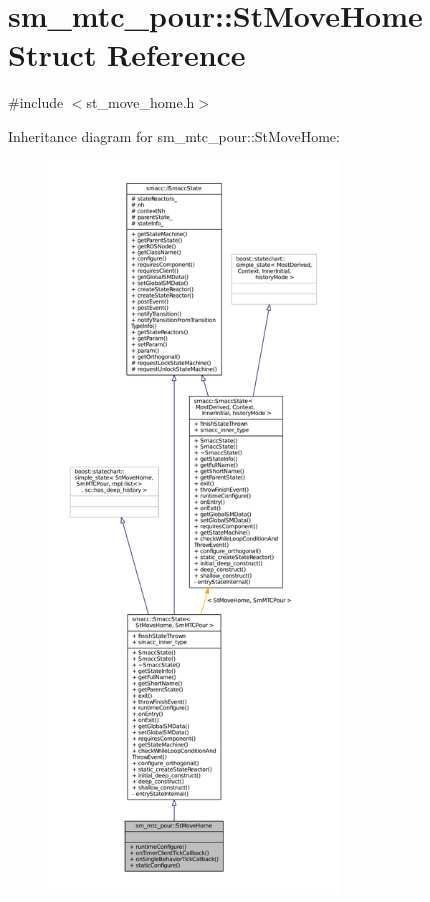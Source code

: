 \hypertarget{structsm__mtc__pour_1_1StMoveHome}{}\section{sm\+\_\+mtc\+\_\+pour\+:\+:St\+Move\+Home Struct Reference}
\label{structsm__mtc__pour_1_1StMoveHome}


{\ttfamily \#include $<$st\+\_\+move\+\_\+home.\+h$>$}



Inheritance diagram for sm\+\_\+mtc\+\_\+pour\+:\+:St\+Move\+Home\+:
\nopagebreak
\begin{figure}[H]
\begin{center}
\leavevmode
\includegraphics[height=550pt]{structsm__mtc__pour_1_1StMoveHome__inherit__graph}
\end{center}
\end{figure}


